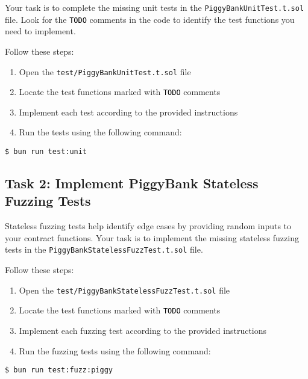 \documentclass[12pt]{article}
\newcommand{\codegrey}[1]{%
  \texttt{\colorbox{black!4}{\textcolor{black}{#1}}}%
}
\begin{document}
Your task is to complete the missing unit tests in the \texttt{PiggyBankUnitTest.t.sol} file. Look for the \codegrey{TODO} comments in the code to identify the test functions you need to implement.

Follow these steps:
\begin{enumerate}
    \item Open the \texttt{test/PiggyBankUnitTest.t.sol} file
    \item Locate the test functions marked with \codegrey{TODO} comments
    \item Implement each test according to the provided instructions
    \item Run the tests using the following command:
\end{enumerate}

\noindent \begin{minipage}{\textwidth}
\begin{verbatim}
$ bun run test:unit
\end{verbatim}
\end{minipage}

\subsection*{Task 2: Implement PiggyBank Stateless Fuzzing Tests}

Stateless fuzzing tests help identify edge cases by providing random inputs to your contract functions. Your task is to implement the missing stateless fuzzing tests in the \texttt{PiggyBankStatelessFuzzTest.t.sol} file.

Follow these steps:
\begin{enumerate}
    \item Open the \texttt{test/PiggyBankStatelessFuzzTest.t.sol} file
    \item Locate the test functions marked with \codegrey{TODO} comments
    \item Implement each fuzzing test according to the provided instructions
    \item Run the fuzzing tests using the following command:
\end{enumerate}

\noindent \begin{minipage}{\textwidth}
\begin{verbatim}
$ bun run test:fuzz:piggy
\end{verbatim}
\end{minipage}
\end{document}
